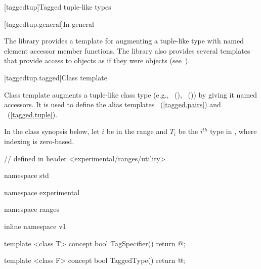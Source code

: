 \begin{addedblock}
[taggedtup]{Tagged tuple-like types}

[taggedtup.general]{In general}

\pnum The library provides a template for augmenting a tuple-like type with named element accessor
member functions. The library also provides several templates that provide access to 
objects as if they were  objects (see~).


[taggedtup.tagged]{Class template }

\pnum
Class template  augments a tuple-like class type (e.g., ~(),
~()) by giving it named accessors. It is used to define the alias
templates ~(\ref{tagged.pairs}) and
~(\ref{tagged.tuple}).

\pnum In the class synopsis below, let $i$ be in the range
 and $T_i$ be the $i^{th}$ type in , where indexing
is zero-based.

%
\begin{codeblock}
// defined in header <experimental/ranges/utility>

namespace std { namespace experimental { namespace ranges { inline namespace v1 {
  template <class T>
  concept bool TagSpecifier() {
    return @\impdef@;
  }

  template <class F>
  concept bool TaggedType() {
    return @\impdef@;
  }

}}}}
\end{codeblock}
\end{addedblock}
